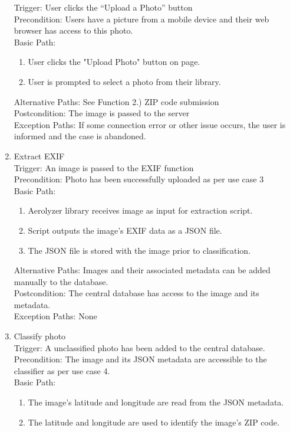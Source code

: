 \documentclass[journal,10pt,draftclsnofoot,onecolumn]{IEEEtran}
\begin{document}
\begin{singlespace}
\begin{enumerate}
Trigger: User clicks the “Upload a Photo” button\\
Precondition: Users have a picture from a mobile device and their web browser has access to this photo.\\
Basic Path:\begin{enumerate}
\item User clicks the "Upload Photo" button on page.
\item User is prompted to select a photo from their library.
\end{enumerate}
Alternative Paths: See Function 2.) ZIP code submission\\
Postcondition: The image is passed to the server\\
Exception Paths: If some connection error or other issue occurs, the user is informed and the case is abandoned.
\\
\item Extract EXIF\\
Trigger: An image is passed to the EXIF function\\
Precondition: Photo has been successfully uploaded as per use case 3\\
Basic Path:\begin{enumerate} 
\item Aerolyzer library receives image as input for extraction script.
\item Script outputs the image's EXIF data as a JSON file.
\item The JSON file is stored with the image prior to classification.
\end{enumerate}
Alternative Paths: Images and their associated metadata can be added manually to the database.\\
Postcondition: The central database has access to the image and its metadata.\\
Exception Paths: None
\\
\item Classify photo\\
Trigger: A unclassified photo has been added to the central database.\\
Precondition: The image and its JSON metadata are accessible to the classifier as per use case 4.\\
Basic Path:\begin{enumerate}
\item The image's latitude and longitude are read from the JSON metadata.
\item The latitude and longitude are used to identify the image's ZIP code.

\end{enumerate}
\end{enumerate}
\end{singlespace}
\end{document}
